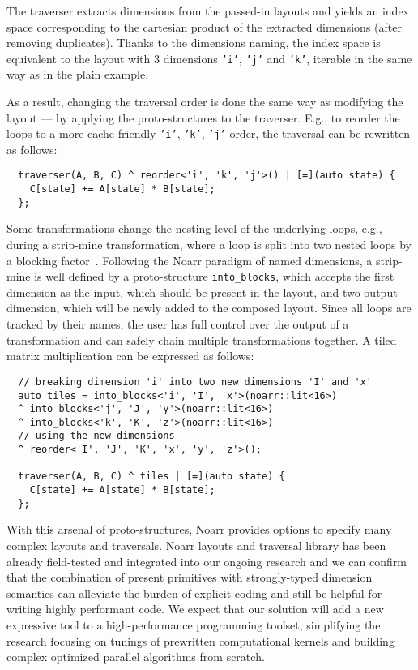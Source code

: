 The traverser extracts dimensions from the passed-in layouts and yields an index space corresponding to the cartesian product of the extracted dimensions (after removing duplicates). Thanks to the dimensions naming, the index space is equivalent to the layout with $3$ dimensions \texttt{'i'}, \texttt{'j'} and \texttt{'k'}, iterable in the same way as in the plain example.

As a result, changing the traversal order is done the same way as modifying the layout --- by applying the proto-structures to the traverser. E.g., to reorder the loops to a more cache-friendly \texttt{'i'}, \texttt{'k'}, \texttt{'j'} order, the traversal can be rewritten as follows:

\begin{verbatim}
  traverser(A, B, C) ^ reorder<'i', 'k', 'j'>() | [=](auto state) {
    C[state] += A[state] * B[state];
  };
\end{verbatim}

Some transformations change the nesting level of the underlying loops, e.g., during a strip-mine transformation, where a loop is split into two nested loops by a blocking factor~\cite{mckinley1996improving}. Following the Noarr paradigm of named dimensions, a strip-mine is well defined by a proto-structure \texttt{into_blocks}, which accepts the first dimension as the input, which should be present in the layout, and two output dimension, which will be newly added to the composed layout. Since all loops are tracked by their names, the user has full control over the output of a transformation and can safely chain multiple transformations together. A tiled matrix multiplication can be expressed as follows:
\begin{verbatim}
  // breaking dimension 'i' into two new dimensions 'I' and 'x'
  auto tiles = into_blocks<'i', 'I', 'x'>(noarr::lit<16>)
  ^ into_blocks<'j', 'J', 'y'>(noarr::lit<16>)
  ^ into_blocks<'k', 'K', 'z'>(noarr::lit<16>)
  // using the new dimensions
  ^ reorder<'I', 'J', 'K', 'x', 'y', 'z'>(); 

  traverser(A, B, C) ^ tiles | [=](auto state) {
    C[state] += A[state] * B[state];
  }; 
\end{verbatim}

With this arsenal of proto-structures, Noarr provides options to specify many complex layouts and traversals. Noarr layouts and traversal library has been already field-tested and integrated into our ongoing research and we can confirm that the combination of present primitives with strongly-typed dimension semantics can alleviate the burden of explicit coding and still be helpful for writing highly performant code. We expect that our solution will add a new expressive tool to a high-performance programming toolset, simplifying the research focusing on tunings of prewritten computational kernels and building complex optimized parallel algorithms from scratch.

